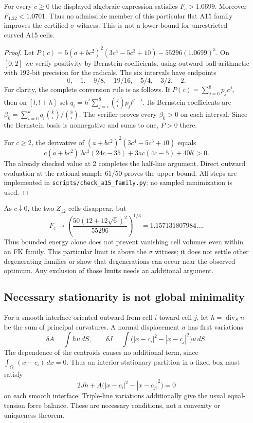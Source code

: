 \documentclass[11pt,a4paper]{report}
\begin{document}
\begin{proposition}\label{prop:a15}
For every $c\geq0$ the displayed algebraic expression satisfies
$F_c>1.0699$. Moreover $F_{1.22}<1.0701$. Thus no admissible member of
this particular flat A15 family improves the certified $\sigma$ witness.
This is not a lower bound for unrestricted curved A15 cells.
\end{proposition}
\begin{proof}
Let
$P(c)=5(a+bc^2)^2(3c^4-5c^3+10)-55296(1.0699)^3$.
On $[0,2]$ we verify positivity by Bernstein coefficients, using outward
ball arithmetic with 192-bit precision for the radicals. The six intervals
have endpoints
\[
 0,\quad 1,\quad 9/8,\quad 19/16,\quad 5/4,\quad 3/2,\quad 2.
\]
For clarity, the complete conversion rule is as follows. If
$P(c)=\sum_{j=0}^8p_jc^j$, then on $[l,l+h]$ set
$q_i=h^i\sum_{j=i}^8\binom ji p_jl^{j-i}$. Its Bernstein coefficients
are $\beta_k=\sum_{i=0}^k q_i\binom ki/\binom8i$.
The verifier proves every $\beta_k>0$ on each interval. Since the
Bernstein basis is nonnegative and sums to one, $P>0$ there.

For $c\geq2$, the derivative of $(a+bc^2)^2(3c^4-5c^3+10)$ equals
\[
 c(a+bc^2)\bigl[bc^3(24c-35)+3ac(4c-5)+40b\bigr]>0.
\]
The already checked value at 2 completes the half-line argument.
Direct outward evaluation at the rational sample $61/50$ proves the
upper bound. All steps are implemented in
\texttt{scripts/check\_a15\_family.py}; no sampled minimization is used.
\end{proof}

As $c\downarrow0$, the two $Z_{12}$ cells disappear, but
\[
 F_c\longrightarrow
 \left(\frac{50(12+12\sqrt6)^2}{55296}\right)^{1/3}
 =1.157131807984\ldots.
\]
Thus bounded energy alone does not prevent vanishing cell volumes even
within an FK family. This particular limit is above the $\sigma$ witness;
it does not settle other degenerating families or show that degenerations
can occur near the observed optimum. Any exclusion of those limits needs
an additional argument.

\subsection{Necessary stationarity is not global minimality}

For a smooth interface oriented outward from cell $i$ toward cell $j$,
let $h=\operatorname{div}_{\!S}n$ be the sum of principal curvatures. A
normal displacement $u$ has first variations
\[
 \delta A=\int h u\,dS,\qquad
 \delta J=\int\bigl(|x-c_i|^2-|x-c_j|^2\bigr)u\,dS.
\]
The dependence of the centroids causes no additional term, since
$\int_{\Omega_i}(x-c_i)\,dx=0$. Thus an interior stationary partition
in a fixed box must satisfy
\[
 2J h+A\bigl(|x-c_i|^2-|x-c_j|^2\bigr)=0
\]
on each smooth interface. Triple-line variations additionally give the
usual equal-tension force balance. These are necessary conditions, not a
convexity or uniqueness theorem.
\end{document}
